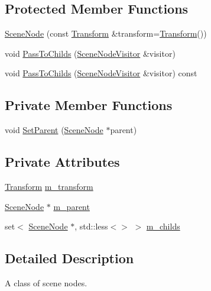 \subsection*{Protected Member Functions}
\begin{DoxyCompactItemize}
\item 
\hyperlink{classmage_1_1_scene_node_a1d6869990a42bcbd0508ae2ca1d318eb}{Scene\+Node} (const \hyperlink{structmage_1_1_transform}{Transform} \&transform=\hyperlink{structmage_1_1_transform}{Transform}())
\item 
void \hyperlink{classmage_1_1_scene_node_a4b46b3ab755050765ebc9fd15580068a}{Pass\+To\+Childs} (\hyperlink{classmage_1_1_scene_node_visitor}{Scene\+Node\+Visitor} \&visitor)
\item 
void \hyperlink{classmage_1_1_scene_node_a72a785a090d9f316c8f5516deddf5b7e}{Pass\+To\+Childs} (\hyperlink{classmage_1_1_scene_node_visitor}{Scene\+Node\+Visitor} \&visitor) const
\end{DoxyCompactItemize}
\subsection*{Private Member Functions}
\begin{DoxyCompactItemize}
\item 
void \hyperlink{classmage_1_1_scene_node_a27d5219ff4c1f2b1c37899456af518ae}{Set\+Parent} (\hyperlink{classmage_1_1_scene_node}{Scene\+Node} $\ast$parent)
\end{DoxyCompactItemize}
\subsection*{Private Attributes}
\begin{DoxyCompactItemize}
\item 
\hyperlink{structmage_1_1_transform}{Transform} \hyperlink{classmage_1_1_scene_node_af1384e71b5cc527df881c7272e9fa518}{m\+\_\+transform}
\item 
\hyperlink{classmage_1_1_scene_node}{Scene\+Node} $\ast$ \hyperlink{classmage_1_1_scene_node_a507db45672f28f899f6c7b0f6a292202}{m\+\_\+parent}
\item 
set$<$ \hyperlink{classmage_1_1_scene_node}{Scene\+Node} $\ast$, std\+::less$<$$>$ $>$ \hyperlink{classmage_1_1_scene_node_afd031fb3c5ae4cef203fe8c85be0187e}{m\+\_\+childs}
\end{DoxyCompactItemize}


\subsection{Detailed Description}
A class of scene nodes. 

